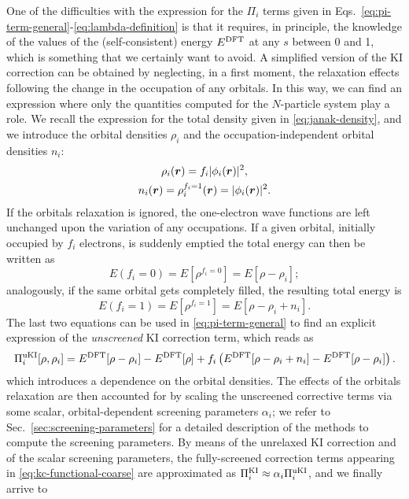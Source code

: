 One of the difficulties with the expression for the $\Pi_i$ terms given in Eqs.~\eqref{eq:pi-term-general}-\eqref{eq:lambda-definition} is that it requires, in principle, the knowledge of the values of the (self-consistent) energy $E^{\rm DFT}$ at any $s$ between 0 and 1, which is something that we certainly want to avoid. A simplified version of the KI correction can be obtained by neglecting, in a first moment, the relaxation effects following the change in the occupation of any orbitals. In this way, we can find an expression where only the quantities computed for the $N$-particle system play a role. We recall the expression for the total density given in \cref{eq:janak-density}, and we introduce the orbital densities $\rho_i$ and the occupation-independent orbital densities $n_i$:
%
\begin{equation}
    \begin{gathered}
    \rho_i({\bm r}) = f_i |\phi_i({\bm r})|^2 , \\
    n_i({\bm r}) = \rho_i^{f_i=1}({\bm r}) = |\phi_i({\bm r})|^2 .
    \end{gathered}
    \label{eq:orbital-densities}
\end{equation}
%
If the orbitals relaxation is ignored, the one-electron wave functions are left unchanged upon the variation of any occupations. If a given orbital, initially occupied by $f_i$ electrons, is suddenly emptied the total energy can then be written as
%
\begin{equation}
    E(f_i=0) = E[\rho^{f_i=0}] = E[\rho-\rho_i] ;
    \label{eq:unrelaxed-energy-emptied-orbital}
\end{equation}
%
analogously, if the same orbital gets completely filled, the resulting total energy is
%
\begin{equation}
    E(f_i=1) = E[\rho^{f_i=1}] = E[\rho-\rho_i+n_i] .
    \label{eq:unrelaxed-energy-filled-orbital}
\end{equation}
%
The last two equations can be used in \cref{eq:pi-term-general} to find an explicit expression of the \emph{unscreened} KI correction term, which reads as
%
\begin{equation}
    \Pi_i^{\rm uKI}[\rho,\rho_i] = E^{\rm DFT}[\rho - \rho_i] - E^{\rm DFT}[\rho] + f_i \left( E^{\rm DFT}[\rho - \rho_i + n_i] - E^{\rm DFT}[\rho - \rho_i] \right) .
    \label{eq:ki-correction}
\end{equation}
%
which introduces a dependence on the orbital densities. The effects of the orbitals relaxation are then accounted for by scaling the unscreened corrective terms via some scalar, orbital-dependent screening parameters $\alpha_i$; we refer to Sec.~\ref{sec:screening-parameters} for a detailed description of the methods to compute the screening parameters. By means of the unrelaxed KI correction and of the scalar screening parameters, the fully-screened correction terms appearing in \cref{eq:kc-functional-coarse} are approximated as $\Pi_i^{\rm KI} \approx \alpha_i \Pi_i^{\rm uKI}$, and we finally arrive to \cite{borghi_koopmans-compliant_2014}
